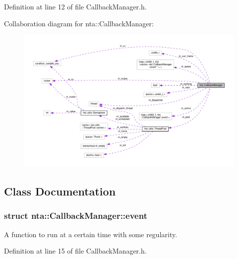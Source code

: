 Definition at line 12 of file Callback\+Manager.\+h.



Collaboration diagram for nta\+:\+:Callback\+Manager\+:\nopagebreak
\begin{figure}[H]
\begin{center}
\leavevmode
\includegraphics[width=350pt]{dc/df2/classnta_1_1CallbackManager__coll__graph}
\end{center}
\end{figure}


\subsection{Class Documentation}
\label{structnta_1_1CallbackManager_1_1event}
\subsubsection{struct nta\+:\+:Callback\+Manager\+:\+:event}
A function to run at a certain time with some regularity. 

Definition at line 15 of file Callback\+Manager.\+h.



